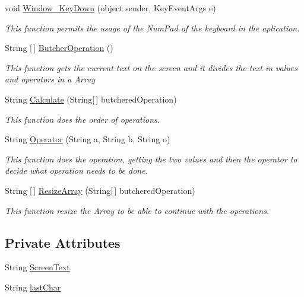 \begin{DoxyCompactItemize}
void \mbox{\hyperlink{class_p_a_c4_______calculadora_1_1_main_window_a45c2b3e046115db99c9e662f6a002afd}{Window\+\_\+\+Key\+Down}} (object sender, Key\+Event\+Args e)
\begin{DoxyCompactList}\small\item\em This function permits the usage of the Num\+Pad of the keyboard in the aplication. \end{DoxyCompactList}\item 
String \mbox{[}$\,$\mbox{]} \mbox{\hyperlink{class_p_a_c4_______calculadora_1_1_main_window_a2ccd0aeaba2aaf4e1535f2bf6fe43e6c}{Butcher\+Operation}} ()
\begin{DoxyCompactList}\small\item\em This function gets the current text on the screen and it divides the text in values and operators in a Array \end{DoxyCompactList}\item 
String \mbox{\hyperlink{class_p_a_c4_______calculadora_1_1_main_window_a58ba74bda855d9a8ce9425450a703dd6}{Calculate}} (String\mbox{[}$\,$\mbox{]} butchered\+Operation)
\begin{DoxyCompactList}\small\item\em This function does the order of operations. \end{DoxyCompactList}\item 
String \mbox{\hyperlink{class_p_a_c4_______calculadora_1_1_main_window_a563642c8d66bce5c42fb1e283c8daedb}{Operator}} (String a, String b, String o)
\begin{DoxyCompactList}\small\item\em This function does the operation, getting the two values and then the operator to decide what operation needs to be done. \end{DoxyCompactList}\item 
String \mbox{[}$\,$\mbox{]} \mbox{\hyperlink{class_p_a_c4_______calculadora_1_1_main_window_ad6d11764ea168d7bd9535ca468769566}{Resize\+Array}} (String\mbox{[}$\,$\mbox{]} butchered\+Operation)
\begin{DoxyCompactList}\small\item\em This function resize the Array to be able to continue with the operations. \end{DoxyCompactList}\end{DoxyCompactItemize}
\subsection*{Private Attributes}
\begin{DoxyCompactItemize}
\item 
String \mbox{\hyperlink{class_p_a_c4_______calculadora_1_1_main_window_aee69de38aec96054ba9ea9b83b202d2d}{Screen\+Text}}
\item 
String \mbox{\hyperlink{class_p_a_c4_______calculadora_1_1_main_window_a4c5f3600067730fbb48d6c7c5d2c8912}{last\+Char}}
\end{DoxyCompactItemize}


